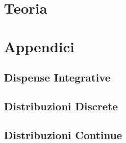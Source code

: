 \documentclass[11pt,twoside]{extbook}
\theoremstyle{blacknumbox}
\begin{document}
\let\cleardoublepage\clearpage 

\tableofcontents

\part{Teoria}

















\part{Appendici}

\appendix
\chapter{Dispense Integrative}




\chapter{Distribuzioni Discrete}
 






\chapter{Distribuzioni Continue}




\end{document}
